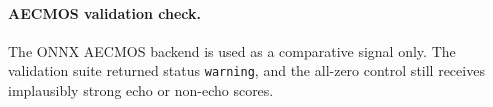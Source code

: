 \paragraph{AECMOS validation check.}
The ONNX AECMOS backend is used as a comparative signal only. The validation suite returned status \texttt{warning}, and the all-zero control still receives implausibly strong echo or non-echo scores.
